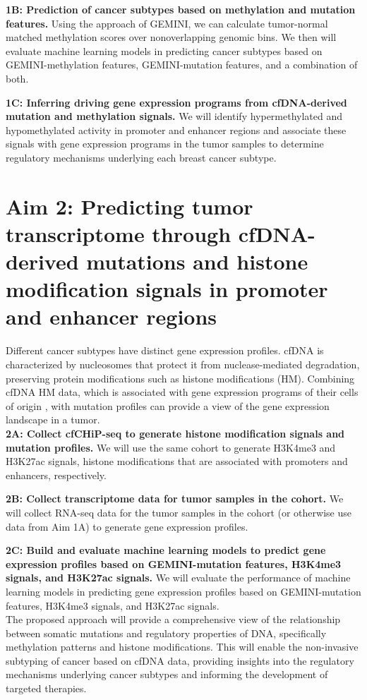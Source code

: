 \documentclass[11pt]{article}
\begin{document}
\noindent \textbf{1B: Prediction of cancer subtypes based on methylation and mutation features.}
Using the approach of GEMINI, we can calculate tumor-normal matched methylation scores over nonoverlapping genomic bins. We then will evaluate machine learning models in predicting cancer subtypes based on GEMINI-methylation features, GEMINI-mutation features, and a combination of both.

\noindent \textbf{1C: Inferring driving gene expression programs from cfDNA-derived mutation and methylation signals.}
We will identify hypermethylated and hypomethylated activity in promoter and enhancer regions and associate these signals with gene expression programs in the tumor samples to determine regulatory mechanisms underlying each breast cancer subtype.
\section*{Aim 2: Predicting tumor transcriptome through cfDNA-derived mutations and histone modification signals in promoter and enhancer regions}
Different cancer subtypes have distinct gene expression profiles. cfDNA is characterized by nucleosomes that protect it from nuclease-mediated degradation, preserving protein modifications such as histone modifications (HM). Combining cfDNA HM data, which is associated with gene expression programs of their cells of origin \cite{sadeh_chip-seq_2021, trier_maansson_cell-free_2023, baca_liquid_2023}, with mutation profiles can provide a view of the gene expression landscape in a tumor.
\medskip \\
\noindent \textbf{2A: Collect cfCHiP-seq \cite{baca_liquid_2023} to generate histone modification signals and mutation profiles.} We will use the same cohort to generate H3K4me3 and H3K27ac signals, histone modifications that are associated with promoters and enhancers, respectively.

\noindent \textbf{2B: Collect transcriptome data for tumor samples in the cohort.} We will collect RNA-seq data for the tumor samples in the cohort (or otherwise use data from Aim 1A) to generate gene expression profiles.

\noindent \textbf{2C: Build and evaluate machine learning models to predict gene expression profiles based on GEMINI-mutation features, H3K4me3 signals, and H3K27ac signals.} We will evaluate the performance of machine learning models in predicting gene expression profiles based on GEMINI-mutation features, H3K4me3 signals, and H3K27ac signals. 
\medskip \\
\noindent The proposed approach will provide a comprehensive view of the relationship between somatic mutations and regulatory properties of DNA, specifically methylation patterns and histone modifications. This will enable the non-invasive subtyping of cancer based on cfDNA data, providing insights into the regulatory mechanisms underlying cancer subtypes and informing the development of targeted therapies.
\end{document}
